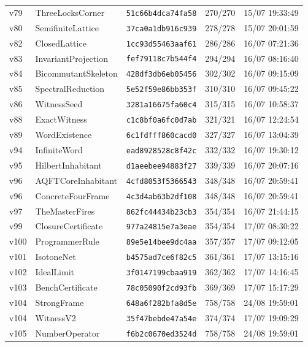 \documentclass[11pt]{article}
\theoremstyle{definition}\newtheorem{deriv}{Derivation}
\begin{document}
{\begin{longtable}{@{}lllll@{}}
v79 & ThreeLocksCorner & \texttt{51c66b4dca74fa58} & 270/270 & 15/07 19:33:49 \\
v80 & SemifiniteLattice & \texttt{37ca0a1db916c939} & 278/278 & 15/07 20:01:59 \\
v82 & ClosedLattice & \texttt{1cc93d55463aaf61} & 286/286 & 16/07 07:21:36 \\
v83 & InvariantProjection & \texttt{fef79118c7b544f4} & 294/294 & 16/07 08:16:40 \\
v84 & BicommutantSkeleton & \texttt{428df3db6eb05456} & 302/302 & 16/07 09:15:09 \\
v85 & SpectralReduction & \texttt{5e52f59e86bb353f} & 310/310 & 16/07 09:45:22 \\
v86 & WitnessSeed & \texttt{3281a16675fa60c4} & 315/315 & 16/07 10:58:37 \\
v88 & ExactWitness & \texttt{c1c8bf0a6fc0d7ab} & 321/321 & 16/07 12:24:54 \\
v89 & WordExistence & \texttt{6c1fdfff860cacd0} & 327/327 & 16/07 13:04:39 \\
v94 & InfiniteWord & \texttt{ead8928528c8f42c} & 332/332 & 16/07 19:30:12 \\
v95 & HilbertInhabitant & \texttt{d1aeebee94883f27} & 339/339 & 16/07 20:07:16 \\
v96 & AQFTCoreInhabitant & \texttt{4cfd8053f5366543} & 348/348 & 16/07 20:59:41 \\
v96 & ConcreteFourFrame & \texttt{4c3d4ab63b2df108} & 348/348 & 16/07 20:59:41 \\
v97 & TheMasterFires & \texttt{862fc44434b23cb3} & 354/354 & 16/07 21:44:15 \\
v99 & ClosureCertificate & \texttt{977a24815e7a3eae} & 354/354 & 17/07 08:30:22 \\
v100 & ProgrammerRule & \texttt{89e5e14bee9dc4aa} & 357/357 & 17/07 09:12:05 \\
v101 & IsotoneNet & \texttt{b4575ad7ce6f82c5} & 361/361 & 17/07 13:15:16 \\
v102 & IdealLimit & \texttt{3f0147199cbaa919} & 362/362 & 17/07 14:16:45 \\
v103 & BenchCertificate & \texttt{78c05090f2cd93fb} & 369/369 & 17/07 15:17:29 \\
v104 & StrongFrame & \texttt{648a6f282bfa8d5e} & 758/758 & 24/08 19:59:01 \\
v104 & WitnessV2 & \texttt{35f47bebde47a54e} & 374/374 & 17/07 19:09:29 \\
v105 & NumberOperator & \texttt{f6b2c0670ed3524d} & 758/758 & 24/08 19:59:01 \\

\end{longtable}}
\end{document}
